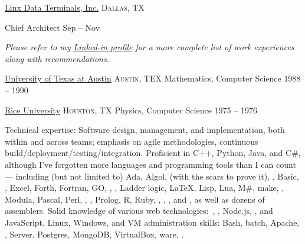 \documentclass[10pt,a4paper]{article}
\begin{document}
\vspace*{1em}
\headedsection
  {\href{http://www.linxdata.com/}{Linx Data Terminals, Inc.}}
  {\textsc{Dallas, TX}} {%

  \headedsubsection
    {Chief Architect}
    {Sep  -- Nov }
    {}
}

\vspace{-0.2em}
\begin{center}
  \emph{\small Please refer to my \href{http://www.linkedin.com/in/jfogarty}{Linked-in profile} for a more complete list of work experiences along with recommendations.}
\end{center}


\spacedhrule{-0.2em}{-0.4em}


\headedsection
  {\href{https://www.utexas.edu/}{University of Texas at Austin}}
  {\textsc{Austin, TEX}} {%
  \headedsubsection
    {Mathematics, Computer Science}
    {1988 -- 1990} {}
}

\headedsection
  {\href{http://www.rice.edu/}{Rice University}}
  {\textsc{Houston, TX}} {%
  \headedsubsection
    {Physics, Computer Science}
    {1975 -- 1976} {}
}


\spacedhrule{0.5em}{-0.4em}


\inlineheadsection  %
  {Technical expertise:}
  {Software design, management, and implementation, both within and across teams; emphasis on agile methodologies, continuous build/deployment/testing/integration.  
  Proficient in C++, Python, Java, and C\#, although I've forgotten more languages and programming tools than I can count --- including (but not limited to) 
  Ada, Algol, \small{(with the scars to prove it)}, , Basic, , Excel, Forth, Fortran, GO, , , Ladder logic, \LaTeX, Lisp, Lua, M\#, make, , Modula, Pascal, Perl, , , Prolog, R, Ruby, , , , and , as well as dozens of assemblers.
  Solid knowledge of various web technologies:\ , , Node.js, ,  and JavaScript.
  Linux, Windows, and VM administration skills: Bash, batch, Apache, ,  Server, Postgres, MongoDB, VirtualBox, ware, .}
\end{document}
